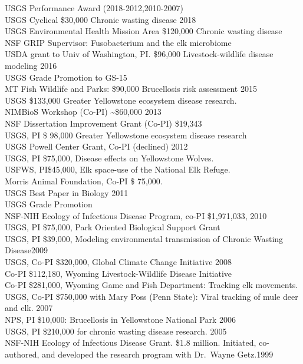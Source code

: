 \documentclass[12pt,]{article}
\begin{document}
USGS Performance Award (2018-2012,2010-2007)\\
USGS Cyclical \$30,000 Chronic wasting disease \hfill 2018\\
USGS Environmental Health Mission Area \$120,000 Chronic wasting
disease\\
NSF GRIP Supervisor: Fusobacterium and the elk microbiome\\
USDA grant to Univ of Washington, PI. \$96,000 Livestock-wildlife
disease modeling \hfill 2016\\
USGS Grade Promotion to GS-15\\
MT Fish Wildlife and Parks: \$90,000 Brucellosis risk assessment
\hfill 2015\\
USGS \$133,000 Greater Yellowstone ecosystem disease research.\\
NIMBioS Workshop (Co-PI) \textasciitilde{}\$60,000 \hfill 2013\\
NSF Dissertation Improvement Grant (Co-PI) \$19,343\\
USGS, PI \$ 98,000 Greater Yellowstone ecosystem disease research\\
USGS Powell Center Grant, Co-PI (declined) \hfill 2012\\
USGS, PI \$75,000, Disease effects on Yellowstone Wolves.\\
USFWS, PI\$45,000, Elk space-use of the National Elk Refuge.\\
Morris Animal Foundation, Co-PI \$ 75,000.\\
USGS Best Paper in Biology \hfill 2011\\
USGS Grade Promotion\\
NSF-NIH Ecology of Infectious Disease Program, co-PI \$1,971,033,
\hfill 2010\\
USGS, PI \$75,000, Park Oriented Biological Support Grant\\
USGS, PI \$39,000, Modeling environmental transmission of Chronic
Wasting Disease\hfill 2009\\
USGS, Co-PI \$320,000, Global Climate Change Initiative \hfill 2008\\
Co-PI \$112,180, Wyoming Livestock-Wildlife Disease Initiative\\
Co-PI \$281,000, Wyoming Game and Fish Department: Tracking elk
movements.\\
USGS, Co-PI \$750,000 with Mary Poss (Penn State): Viral tracking of
mule deer and elk. \hfill 2007\\
NPS, PI \$10,000: Brucellosis in Yellowstone National Park \hfill 2006\\
USGS, PI \$210,000 for chronic wasting disease research. \hfill 2005\\
NSF-NIH Ecology of Infectious Disease Grant. \$1.8 million. Initiated,
co-authored, and developed the research program with Dr.~Wayne
Getz.\hfill 1999
\end{document}
